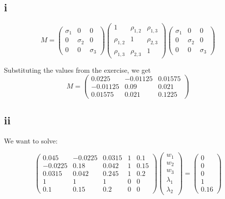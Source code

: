 \documentclass{article}
\begin{document}
\subsection*{i}
\[
    M =
    \begin{pmatrix}
        \sigma_1 & 0        & 0        \\
        0        & \sigma_2 & 0        \\
        0        & 0        & \sigma_3
    \end{pmatrix}
    \begin{pmatrix}
        1          & \rho_{1,2} & \rho_{1,3} \\
        \rho_{1,2} & 1          & \rho_{2,3} \\
        \rho_{1,3} & \rho_{2,3} & 1
    \end{pmatrix}
    \begin{pmatrix}
        \sigma_1 & 0        & 0        \\
        0        & \sigma_2 & 0        \\
        0        & 0        & \sigma_3
    \end{pmatrix}
\]

Substituting the values from the exercise, we get
\[
    M =
    \begin{pmatrix}
        0.0225   & -0.01125 & 0.01575 \\
        -0.01125 & 0.09     & 0.021   \\
        0.01575  & 0.021    & 0.1225
    \end{pmatrix}
\]
\subsection*{ii}
We want to solve:

\[
    \begin{pmatrix}
        0.045   & -0.0225 & 0.0315 & 1 & 0.1  \\
        -0.0225 & 0.18    & 0.042  & 1 & 0.15 \\
        0.0315  & 0.042   & 0.245  & 1 & 0.2  \\
        1       & 1       & 1      & 0 & 0    \\
        0.1     & 0.15    & 0.2    & 0 & 0
    \end{pmatrix}
    \begin{pmatrix}
        w_1       \\
        w_2       \\
        w_3       \\
        \lambda_1 \\
        \lambda_2
    \end{pmatrix}
    =
    \begin{pmatrix}
        0 \\
        0 \\
        0 \\
        1 \\
        0.16
    \end{pmatrix}
\]
\end{document}
